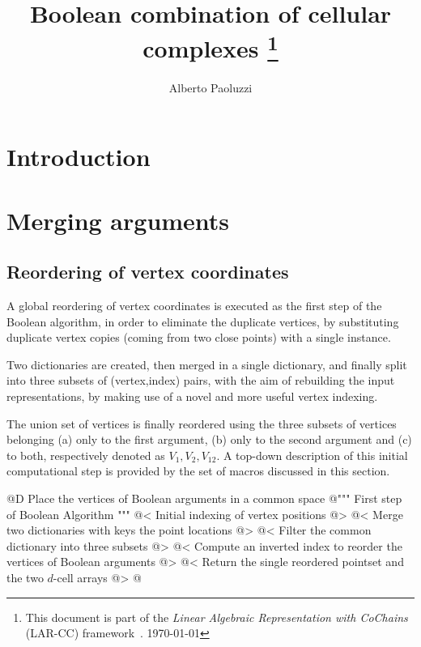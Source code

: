 \documentclass[11pt,oneside]{article}	%
\title{Boolean combination of cellular complexes
\footnote{This document is part of the \emph{Linear Algebraic Representation with CoChains} (LAR-CC) framework~\cite{cclar-proj:2013:00}. \today}
}
\author{Alberto Paoluzzi}
\begin{document}
\maketitle
\tableofcontents
\nonstopmode

\section{Introduction}

\section{Merging arguments}

\subsection{Reordering of vertex coordinates}
A global reordering of vertex coordinates is executed as the first step of the Boolean algorithm, in order to eliminate the duplicate vertices, by substituting duplicate vertex copies (coming from two close points) with a single instance. 

Two dictionaries are created, then merged in a single dictionary, and finally split into three subsets of (vertex,index) pairs, with the aim of rebuilding the input representations, by making use of a novel and more useful vertex indexing.

The union set of vertices is finally reordered using the three subsets of vertices belonging (a) only to the first argument, (b) only to the second argument and (c) to both, respectively denoted as $V_1, V_2, V_{12}$. A top-down description of this initial computational step is provided by the set of macros discussed in this section.

@D Place the vertices of Boolean arguments in a common space
@{""" First step of Boolean Algorithm """
@< Initial indexing of vertex positions @>
@< Merge two dictionaries with keys the point locations @>
@< Filter the common dictionary into three subsets @>
@< Compute an inverted index to reorder the vertices of Boolean arguments @>
@< Return the single reordered pointset and the two $d$-cell arrays @>
@}
\end{document}
